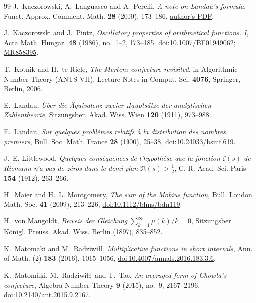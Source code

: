 \documentclass[11pt,reqno]{amsart}
\numberwithin{equation}{section}
\theoremstyle{plain}
\theoremstyle{definition}
\theoremstyle{remark}
\begin{document}
\begin{thebibliography}{99}
J.~Kaczorowski, A.~Languasco and A.~Perelli, \emph{A note on Landau's formula},
Funct. Approx. Comment. Math. \textbf{28} (2000), 173--186,
\href{https://www.dei.unipd.it/~languasco/lavoripdf/R12.pdf}{author's PDF}.

J.~Kaczorowski and J.~Pintz, \emph{Oscillatory properties of arithmetical
functions. I}, Acta Math. Hungar. \textbf{48} (1986), no.~1--2, 173--185.
\href{https://doi.org/10.1007/BF01949062}{doi:10.1007/BF01949062};
\href{https://mathscinet.ams.org/mathscinet-getitem?mr=858395}{MR858395}.

T.~Kotnik and H.~te Riele, \emph{The Mertens conjecture revisited}, in
Algorithmic Number Theory (ANTS VII), Lecture Notes in Comput. Sci.
\textbf{4076}, Springer, Berlin, 2006.

E.~Landau, \emph{\"Uber die \"Aquivalenz zweier Haupts\"atze der analytischen
Zahlentheorie}, Sitzungsber. Akad. Wiss. Wien \textbf{120} (1911), 973--988.

E.~Landau, \emph{Sur quelques probl\`emes relatifs \`a la distribution des
nombres premiers}, Bull. Soc. Math. France \textbf{28} (1900), 25--38,
\href{https://doi.org/10.24033/bsmf.619}{doi:10.24033/bsmf.619}.

J.~E. Littlewood, \emph{Quelques cons\'equences de l'hypoth\`ese que la
fonction $\zeta(s)$ de Riemann n'a pas de z\'eros dans le demi-plan
$\Re(s)>\frac12$}, C. R. Acad. Sci. Paris \textbf{154} (1912), 263--266.

H.~Maier and H.~L. Montgomery, \emph{The sum of the M\"obius function},
Bull. London Math. Soc. \textbf{41} (2009), 213--226,
\href{https://doi.org/10.1112/blms/bdn119}{doi:10.1112/blms/bdn119}.

H.~von Mangoldt, \emph{Beweis der Gleichung $\sum_{k=1}^\infty\mu(k)/k=0$},
Sitzungsber. K\"onigl. Preuss. Akad. Wiss. Berlin (1897), 835--852.

K.~Matom\"aki and M.~Radziwi\l\l, \emph{Multiplicative functions in short
intervals}, Ann. of Math. (2) \textbf{183} (2016), 1015--1056,
\href{https://doi.org/10.4007/annals.2016.183.3.6}{doi:10.4007/annals.2016.183.3.6}.

K.~Matom\"aki, M.~Radziwi\l\l\ and T.~Tao, \emph{An averaged form of Chowla's
conjecture}, Algebra Number Theory \textbf{9} (2015), no.~9, 2167--2196,
\href{https://doi.org/10.2140/ant.2015.9.2167}{doi:10.2140/ant.2015.9.2167}.


\end{thebibliography}
\end{document}
